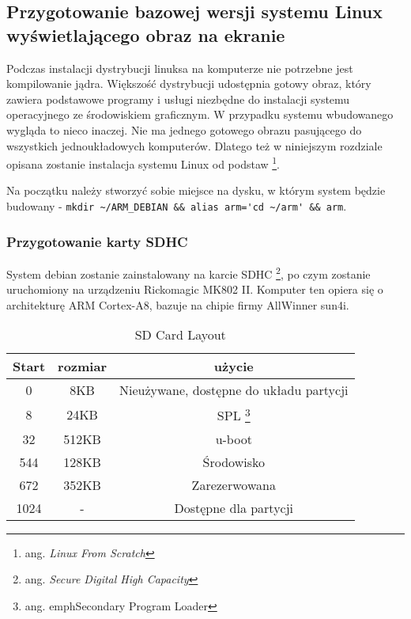 \subsection{Przygotowanie bazowej wersji systemu Linux wyświetlającego obraz na ekranie}


Podczas instalacji dystrybucji linuksa na komputerze nie potrzebne jest kompilowanie jądra. Większość dystrybucji udostępnia gotowy obraz, który zawiera podstawowe programy i usługi niezbędne do instalacji systemu operacyjnego ze środowiskiem graficznym. W przypadku systemu wbudowanego wygląda to nieco inaczej. Nie ma jednego gotowego obrazu pasującego do wszystkich jednoukładowych komputerów. Dlatego też w niniejszym rozdziale opisana zostanie instalacja systemu Linux od podstaw \footnote{ang. \emph{Linux From Scratch}}.

\par


Na początku należy stworzyć sobie miejsce na dysku, w którym system będzie budowany - \lstinline{mkdir ~/ARM_DEBIAN && alias arm='cd ~/arm' && arm}.

\subsubsection{Przygotowanie karty SDHC}


System debian zostanie zainstalowany na karcie SDHC \footnote{ang. \em{Secure Digital High Capacity}}, po czym zostanie uruchomiony na urządzeniu Rickomagic MK802 II. Komputer ten opiera się o architekturę ARM Cortex-A8, bazuje na chipie firmy AllWinner sun4i.
\par
	\begin{table}[t]
		\centering
		\caption{SD Card Layout}
		\label{tab:sd-layout}
	\begin{tabular}{|c|c|c|}
	\hline
	\textbf{Start} & \textbf{rozmiar} & \textbf{użycie} \\ 
	\hline
	0 & 8KB & Nieużywane, dostępne do układu partycji \\
	\hline
	8 & 24KB & SPL \footnote{ang. emph{Secondary Program Loader}} \\
	\hline
	32 & 512KB & u-boot \\
	\hline
	544 & 128KB & Środowisko \\
	\hline
	672 & 352KB & Zarezerwowana \\
	\hline
	1024 & - & Dostępne dla partycji \\
	\hline
	
	
\end{tabular}
\end{table}

